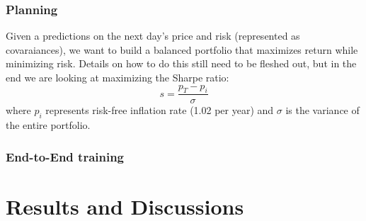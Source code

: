 \documentclass[a4paper, 10pt]{article}
\begin{document}
\begin{spacing}{1.2}
    \subsubsection{Planning}
    Given a predictions on the next day's price and risk (represented as covaraiances), we want to build a balanced portfolio that maximizes return while minimizing risk. Details on how to do this still need to be fleshed out, but in the end we are looking at maximizing the Sharpe ratio: 
    \begin{equation}
    s = \frac{p_T - p_i}{\sigma}
    \end{equation}
    where $p_i$ represents risk-free inflation rate (1.02 per year) and $\sigma$ is the variance of the entire portfolio.
    \subsubsection{End-to-End training}
    
    \section{Results and Discussions}
%    
    
    
  
  \end{spacing}  
  
  
\end{document}
